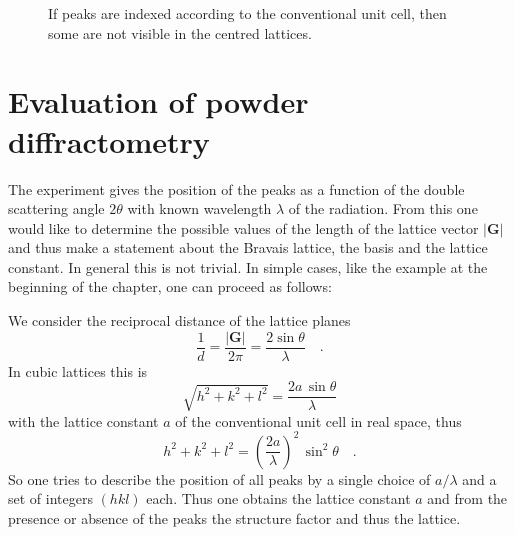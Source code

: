\begin{figure}
  \caption{If peaks are indexed according to the conventional unit cell, then some are not visible in the centred lattices. }
\end{figure}


\section{Evaluation of powder diffractometry}

The experiment gives the position of the peaks as a function of the double scattering angle $2\theta$ with known wavelength $\lambda$ of the radiation. From this one would like to determine the possible values of the length of the lattice vector $|\mathbf{G}|$ and thus make a statement about the Bravais lattice, the basis and the lattice constant. In general this is not trivial. In simple cases, like the example at the beginning of the chapter, one can proceed as follows:

We consider the reciprocal distance of the lattice planes
\begin{equation}
\frac{1}{d} = \frac{|\mathbf{G}|}{2 \pi} = \frac{2 \sin \theta}{ \lambda}  \quad .
\end{equation}
In cubic lattices this is
\begin{equation}
 \sqrt{h^2 + k^2 + l^2} = \frac{2 a \, \sin \theta}{ \lambda}
\end{equation}
with the lattice constant $a$ of the conventional unit cell in real space, thus 
\begin{equation}
 h^2 + k^2 + l^2 = \left(\frac{2 a }{ \lambda} \right)^2 \, \sin^2 \theta \quad .
\end{equation}
So one tries to describe the position of all peaks by a single choice of $a/\lambda$ and a set of integers $(hkl)$ each. Thus one obtains the lattice constant $a$ and from the presence or absence of the peaks the structure factor and thus the lattice.




\printbibliography[segment=\therefsegment,heading=subbibliography]

